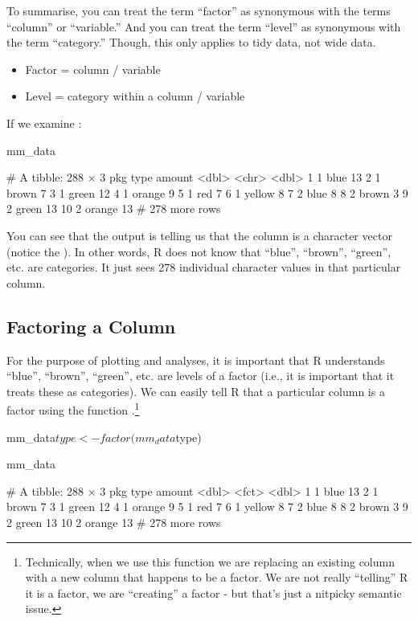 To summarise, you can treat the term ``factor'' as synonymous with the terms ``column'' or ``variable.'' And you can treat the term ``level'' as synonymous with the term ``category.'' Though, this only applies to tidy data, not wide data.
{
\begin{itemize}
  \setlength\itemsep{-1em}
    \item Factor = column / variable
    \item Level = category within a column / variable
\end{itemize}
}

If we examine :

\begin{inR}
mm_data
\end{inR}
\begin{outR}
# A tibble: 288 × 3
     pkg type   amount
   <dbl> <chr>   <dbl>
 1     1 blue       13
 2     1 brown       7
 3     1 green      12
 4     1 orange      9
 5     1 red         7
 6     1 yellow      8
 7     2 blue        8
 8     2 brown       3
 9     2 green      13
10     2 orange     13
# 278 more rows
\end{outR}

\noindent
You can see that the output is telling us that the  column is a character vector (notice the ). In other words, R does not know that ``blue'', ``brown'', ``green'', etc. are categories. It just sees 278 individual character values in that particular column.

\subsection{Factoring a Column}

For the purpose of plotting and analyses, it is important that R understands ``blue'', ``brown'', ``green'', etc. are levels of a factor (i.e., it is important that it treats these as categories). We can easily tell R that a particular column is a factor using the function .\footnote{Technically, when we use this function we are replacing an existing column with a new column that happens to be a factor. We are not really ``telling'' R it is a factor, we are ``creating'' a factor - but that's just a nitpicky semantic issue.}

\begin{inR}
mm_data$type <- factor(mm_data$type)

mm_data
\end{inR}
\begin{outR}
# A tibble: 288 × 3
     pkg type   amount
   <dbl> <fct>   <dbl>
 1     1 blue       13
 2     1 brown       7
 3     1 green      12
 4     1 orange      9
 5     1 red         7
 6     1 yellow      8
 7     2 blue        8
 8     2 brown       3
 9     2 green      13
10     2 orange     13
# 278 more rows
\end{outR}


